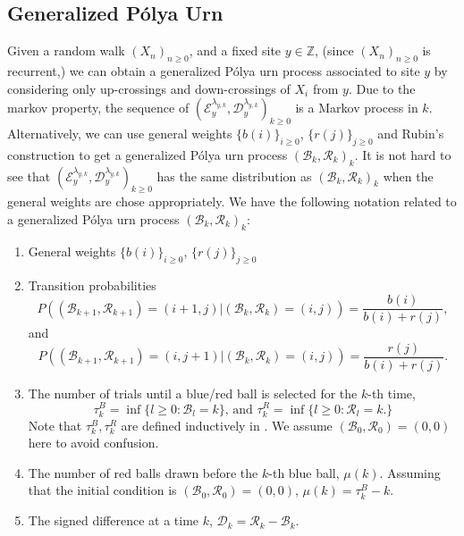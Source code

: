 \documentclass[twoside,12pt,a4paper]{article}
\numberwithin{equation}{section}
\begin{document}
\subsection{Generalized P\'{o}lya  Urn}
Given a random walk $(X_n)_{n\geq 0}$, and a fixed site $y\in \mathbb{Z}$, (since $(X_n)_{n\geq 0}$ is recurrent,) we can obtain a generalized P\'{o}lya urn process associated to site $y$ by considering only up-crossings and down-crossings of $X_i$ from $y$. Due to the markov property, the sequence of $\left(\mathcal{E}^{\lambda_{y,k}}_y, \mathcal{D}^{\lambda_{y,k}}_y\right)_{k\geq 0}$ is a Markov process in $k$. Alternatively, we can use general weights $\{b(i)\}_{i\geq 0}$, $\{r(j)\}_{j\geq 0}$ and Rubin's construction to get a generalized P\'{o}lya urn process $(\mathcal{B}_k,\mathcal{R}_k)_k$. It is not hard to see that $\left(\mathcal{E}^{\lambda_{y,k}}_y, \mathcal{D}^{\lambda_{y,k}}_y\right)_{k\geq 0}$ has the same distribution as $(\mathcal{B}_k,\mathcal{R}_k)_k$ when the general weights are chose appropriately. We have the following notation related to a generalized P\'{o}lya urn process $(\mathcal{B}_k,\mathcal{R}_k)_k$:
\begin{enumerate}
	\item General weights $\{b(i)\}_{i\geq 0}$, $\{r(j)\}_{j\geq 0}$ 
	
	\item Transition probabilities 
	$$ P\left((\mathcal{B}_{k+1},\mathcal{R}_{k+1})=  (i+1,j) \vert (\mathcal{B}_{k},\mathcal{R}_{k}) =(i,j)  \right) = \frac{b(i)}{b(i)+r(j)},$$ and $$
	P\left((\mathcal{B}_{k+1},\mathcal{R}_{k+1})=  (i,j+1) \vert (\mathcal{B}_{k},\mathcal{R}_{k}) =(i,j)  \right) = \frac{r(j)}{b(i)+r(j)}.$$ 
	
	\item The number of trials until a blue/red ball is selected for the $k$-th time,
	$$ \tau^B_k = \inf\{ l\geq 0: \mathcal{B}_{l} =k   \}  \mbox{, and } \tau^R_k = \inf\{ l\geq 0: \mathcal{R}_{l} =k .  \}
	$$
	Note that $\tau^B_k, \tau^R_k$ are defined inductively in \cite{KMP22}. We assume $(\mathcal{B}_{0},\mathcal{R}_{0}) =(0,0) $ here to avoid confusion.
	
	\item The number of red balls drawn before the $k$-th blue ball, $\mu(k)$. Assuming that the initial condition is $(\mathcal{B}_{0},\mathcal{R}_{0}) = (0,0) $, $ \mu(k) =\tau^B_k - k$. 
	
	\item The signed difference at a time $k$, $\mathcal{D}_k =\mathcal{R}_k -\mathcal{B}_k.  $ 
	
\end{enumerate}
\end{document}
